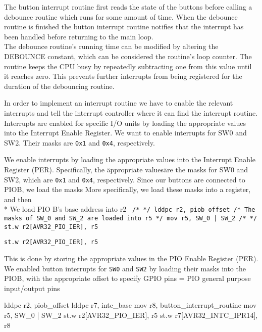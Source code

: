 The button interrupt routine first reads the state of the buttons before calling a debounce routine which runs for some amount of time.
When the debounce routine is finished the button interrupt routine notifies that the interrupt has been handled before returning to the main loop.
\\ %
The debounce routine's running time can be modified by altering the DEBOUNCE constant, which can be considered the routine's loop counter. The routine keeps the CPU busy by repeatedly subtracting one from this value until it reaches zero. This prevents further interrupts from being registered for the duration of the debouncing routine.

In order to implement an interrupt routine we have to enable the relevant interrupts and tell the interrupt controller where it can find the interrupt routine.
Interrupts are enabled for specific I/O units by loading the appropriate values into the Interrupt Enable Register.
We want to enable interrupts for SW0 and SW2.
Their masks are \texttt{0x1} and \texttt{0x4}, respectively.


We enable interrupts by loading the appropriate values into the Interrupt Enable Register (PER).
Specifically, the \"appropriate values\" are the masks for SW0 and SW2, which are \texttt{0x1} and \texttt{0x4}, respectively.
Since our buttons are connected to PIOB, we load the masks
More specifically, we load these masks into a register, and then 
\\*
We load PIO B's base address into r2
\texttt{
		/* */
		lddpc r2, piob_offset
		/* The masks of SW_0 and SW_2 are loaded into r5 */
		mov r5, SW_0 | SW_2
		/* */
		st.w r2[AVR32_PIO_IER], r5
}

\texttt{st.w r2[AVR32_PIO_IER], r5 }

This is done by storing the appropriate values in the PIO Enable Register (PER).
We enabled button interrupts for \texttt{SW0} and \texttt{SW2} by loading their masks into the PIOB, with the appropriate offset to specify
GPIO pins = PIO
general purpose input/output pins

lddpc r2, piob_offset
lddpc r7, intc_base
mov r8, button_interrupt_routine
mov r5, SW_0 | SW_2
st.w r2[AVR32_PIO_IER], r5 
st.w r7[AVR32_INTC_IPR14], r8

